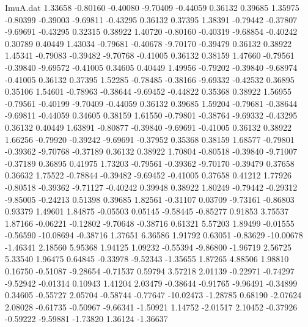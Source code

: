 \begin{filecontents}{ImuA.dat}
   1.33658   -0.80160   -0.40080   -9.70409   -0.44059    0.36132    0.39685
   1.35975   -0.80399   -0.39003   -9.69811   -0.43295    0.36132    0.37395
   1.38391   -0.79442   -0.37807   -9.69691   -0.43295    0.32315    0.38922
   1.40720   -0.80160   -0.40319   -9.68854   -0.40242    0.30789    0.40449
   1.43034   -0.79681   -0.40678   -9.70170   -0.39479    0.36132    0.38922
   1.45341   -0.79083   -0.39482   -9.70768   -0.41005    0.36132    0.38159
   1.47660   -0.79561   -0.39840   -9.69572   -0.41005    0.34605    0.40449
   1.49956   -0.79202   -0.39840   -9.68974   -0.41005    0.36132    0.37395
   1.52285   -0.78485   -0.38166   -9.69332   -0.42532    0.36895    0.35106
   1.54601   -0.78963   -0.38644   -9.69452   -0.44822    0.35368    0.38922
   1.56955   -0.79561   -0.40199   -9.70409   -0.44059    0.36132    0.39685
   1.59204   -0.79681   -0.38644   -9.69811   -0.44059    0.34605    0.38159
   1.61550   -0.79801   -0.38764   -9.69332   -0.43295    0.36132    0.40449
   1.63891   -0.80877   -0.39840   -9.69691   -0.41005    0.36132    0.38922
   1.66256   -0.79920   -0.39242   -9.69691   -0.37952    0.35368    0.38159
   1.68577   -0.79801   -0.39362   -9.70768   -0.37189    0.36132    0.38922
   1.70804   -0.80518   -0.39840   -9.71007   -0.37189    0.36895    0.41975
   1.73203   -0.79561   -0.39362   -9.70170   -0.39479    0.37658    0.36632
   1.75522   -0.78844   -0.39482   -9.69452   -0.41005    0.37658    0.41212
   1.77926   -0.80518   -0.39362   -9.71127   -0.40242    0.39948    0.38922
   1.80249   -0.79442   -0.29312   -9.85005   -0.24213    0.51398    0.39685
   1.82561   -0.31107    0.03709   -9.73161   -0.86803    0.93379    1.49601
   1.84875   -0.05503    0.05145   -9.58445   -0.85277    0.91853    3.75537
   1.87166   -0.06221   -0.12802   -9.70648   -0.38716    0.61321    5.57203
   1.89499   -0.01555   -0.56590  -10.08694   -0.38716    1.37651    6.36586
   1.91792    0.63051   -0.83629  -10.00678   -1.46341    2.18560    5.95368
   1.94125    1.09232   -0.55394   -9.86800   -1.96719    2.56725    5.33540
   1.96475    0.64845   -0.33978   -9.52343   -1.35655    1.87265    4.88506
   1.98810    0.16750   -0.51087   -9.28654   -0.71537    0.59794    3.57218
   2.01139   -0.22971   -0.74297   -9.52942   -0.01314    0.10943    1.41204
   2.03479   -0.38644   -0.91765   -9.96491   -0.34899    0.34605   -0.55727
   2.05704   -0.58744   -0.77647  -10.02473   -1.28785    0.68190   -2.07624
   2.08028   -0.61735   -0.50967   -9.66341   -1.50921    1.14752   -2.01517
   2.10452   -0.37926   -0.59222   -9.59881   -1.73820    1.36124   -1.36637

\end{filecontents}
